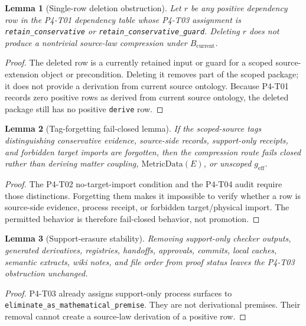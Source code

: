 \documentclass[11pt]{article}
\newcommand{\MetricData}{\mathrm{MetricData}}
\newcommand{\geff}{g_{\mathrm{eff}}}
\newcommand{\Bcur}{B_{\mathrm{current}}}
\newtheorem{lemma}{Lemma}
\begin{document}
\begin{lemma}[Single-row deletion obstruction]
Let \(r\) be any positive dependency row in the P4-T01 dependency table whose
P4-T03 assignment is \texttt{retain\_conservative} or
\texttt{retain\_conservative\_guard}. Deleting \(r\) does not produce a
nontrivial source-law compression under \(\Bcur\).
\end{lemma}

\begin{proof}
The deleted row is a currently retained input or guard for a scoped
source-extension object or precondition. Deleting it removes part of the
scoped package; it does not provide a derivation from current source ontology.
Because P4-T01 records zero positive rows as derived from current source
ontology, the deleted package still has no positive \texttt{derive} row.
\end{proof}

\begin{lemma}[Tag-forgetting fail-closed lemma]
If the scoped-source tags distinguishing conservative evidence, source-side
records, support-only receipts, and forbidden target imports are forgotten,
then the compression route fails closed rather than deriving matter coupling,
\(\MetricData(E)\), or unscoped \(\geff\).
\end{lemma}

\begin{proof}
The P4-T02 no-target-import condition and the P4-T04 audit require those
distinctions. Forgetting them makes it impossible to verify whether a row is
source-side evidence, process receipt, or forbidden target/physical import.
The permitted behavior is therefore fail-closed behavior, not promotion.
\end{proof}

\begin{lemma}[Support-erasure stability]
Removing support-only checker outputs, generated derivatives, registries,
handoffs, approvals, commits, local caches, semantic extracts, wiki notes, and
file order from proof status leaves the P4-T03 obstruction unchanged.
\end{lemma}

\begin{proof}
P4-T03 already assigns support-only process surfaces to
\texttt{eliminate\_as\_mathematical\_premise}. They are not derivational
premises. Their removal cannot create a source-law derivation of a positive
row.
\end{proof}
\end{document}

